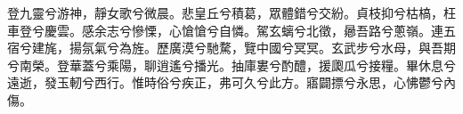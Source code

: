 
\begin{pinyinscope}
登九靈兮游神，靜女歌兮微晨。悲皇丘兮積葛，眾體錯兮交紛。貞枝抑兮枯槁，枉車登兮慶雲。感余志兮慘慄，心愴愴兮自憐。駕玄螭兮北徵，曏吾路兮蔥嶺。連五宿兮建旄，揚氛氣兮為旌。歷廣漠兮馳騖，覽中國兮冥冥。玄武步兮水母，與吾期兮南榮。登華蓋兮乘陽，聊逍遙兮播光。抽庫婁兮酌醴，援瓟瓜兮接糧。畢休息兮遠逝，發玉軔兮西行。惟時俗兮疾正，弗可久兮此方。寤闢摽兮永思，心怫鬱兮內傷。


\end{pinyinscope}